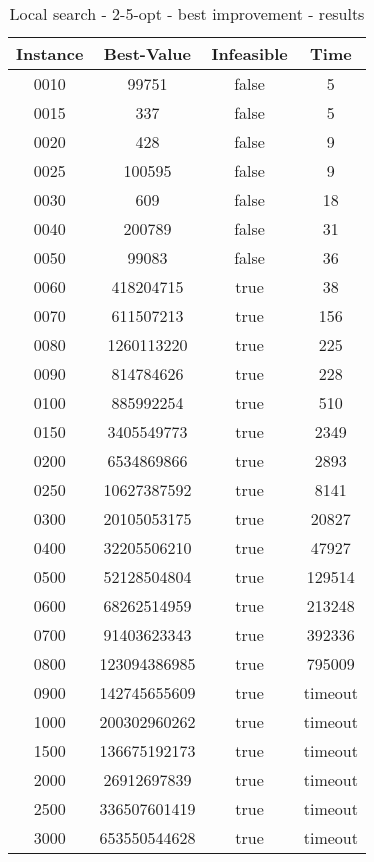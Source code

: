 \begin{table}
\centering
	\begin{tabular}{|| c | c | c | c ||} 
		\hline
		Instance & Best-Value & Infeasible & Time \\
		\hline\hline
0010 & 99751 & false & 5 \\
0015 & 337 & false & 5 \\
0020 & 428 & false & 9 \\
0025 & 100595 & false & 9 \\
0030 & 609 & false & 18 \\
0040 & 200789 & false & 31 \\
0050 & 99083 & false & 36 \\
0060 & 418204715 & true & 38 \\
0070 & 611507213 & true & 156 \\
0080 & 1260113220 & true & 225 \\
0090 & 814784626 & true & 228 \\
0100 & 885992254 & true & 510 \\
0150 & 3405549773 & true & 2349 \\
0200 & 6534869866 & true & 2893 \\
0250 & 10627387592 & true & 8141 \\
0300 & 20105053175 & true & 20827 \\
0400 & 32205506210 & true & 47927 \\
0500 & 52128504804 & true & 129514 \\
0600 & 68262514959 & true & 213248 \\
0700 & 91403623343 & true & 392336 \\
0800 & 123094386985 & true & 795009 \\
0900 & 142745655609 & true & timeout \\
1000 & 200302960262 & true & timeout \\
1500 & 136675192173 & true & timeout \\
2000 & 26912697839 & true & timeout \\
2500 & 336507601419 & true & timeout \\
3000 & 653550544628 & true & timeout \\
		\hline
	\end{tabular}
\caption{Local search - 2-5-opt - best improvement - results}
\end{table}

